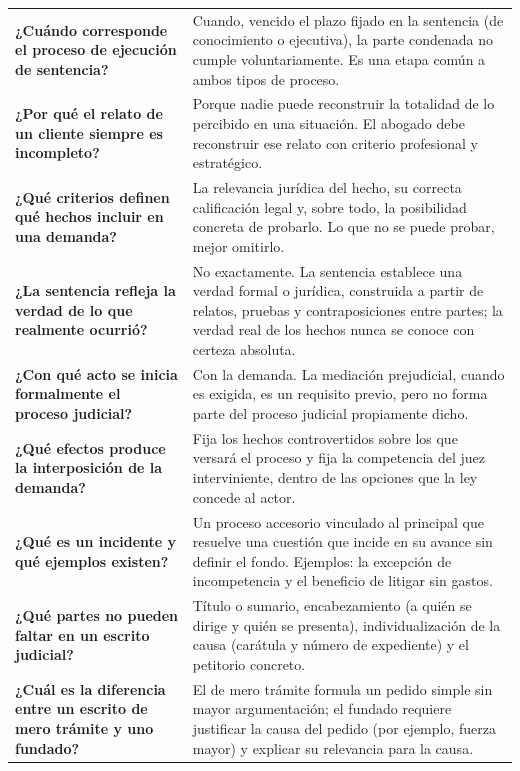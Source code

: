\documentclass[12pt,oneside]{book}
\begin{document}
\begin{table}[H]
\begin{tabularx}{\textwidth}{
    >{\raggedright\arraybackslash}p{}
    >{\raggedright\arraybackslash}X
}
\textbf{¿Cuándo corresponde el proceso de ejecución de sentencia?} & 
Cuando, vencido el plazo fijado en la sentencia (de conocimiento o ejecutiva), la parte condenada no cumple voluntariamente. Es una etapa común a ambos tipos de proceso. \\

\textbf{¿Por qué el relato de un cliente siempre es incompleto?} & 
Porque nadie puede reconstruir la totalidad de lo percibido en una situación. El abogado debe reconstruir ese relato con criterio profesional y estratégico. \\

\textbf{¿Qué criterios definen qué hechos incluir en una demanda?} & 
La relevancia jurídica del hecho, su correcta calificación legal y, sobre todo, la posibilidad concreta de probarlo. Lo que no se puede probar, mejor omitirlo. \\

\textbf{¿La sentencia refleja la verdad de lo que realmente ocurrió?} & 
No exactamente. La sentencia establece una verdad formal o jurídica, construida a partir de relatos, pruebas y contraposiciones entre partes; la verdad real de los hechos nunca se conoce con certeza absoluta. \\

\textbf{¿Con qué acto se inicia formalmente el proceso judicial?} & 
Con la demanda. La mediación prejudicial, cuando es exigida, es un requisito previo, pero no forma parte del proceso judicial propiamente dicho. \\

\textbf{¿Qué efectos produce la interposición de la demanda?} & 
Fija los hechos controvertidos sobre los que versará el proceso y fija la competencia del juez interviniente, dentro de las opciones que la ley concede al actor. \\

\textbf{¿Qué es un incidente y qué ejemplos existen?} & 
Un proceso accesorio vinculado al principal que resuelve una cuestión que incide en su avance sin definir el fondo. Ejemplos: la excepción de incompetencia y el beneficio de litigar sin gastos. \\

\textbf{¿Qué partes no pueden faltar en un escrito judicial?} & 
Título o sumario, encabezamiento (a quién se dirige y quién se presenta), individualización de la causa (carátula y número de expediente) y el petitorio concreto. \\

\textbf{¿Cuál es la diferencia entre un escrito de mero trámite y uno fundado?} & 
El de mero trámite formula un pedido simple sin mayor argumentación; el fundado requiere justificar la causa del pedido (por ejemplo, fuerza mayor) y explicar su relevancia para la causa. \\


\end{tabularx}
\end{table}
\end{document}
